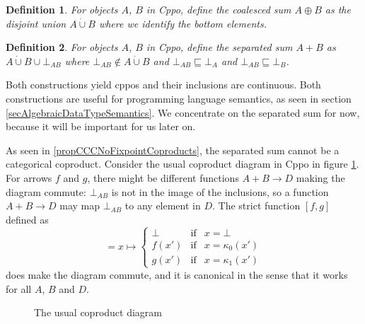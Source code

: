 \documentclass[a4paper]{article}
\newcommand{\below}{\sqsubseteq}
\newcommand{\arr}{\rightarrow}
\newtheorem{definition}{Definition}[section]
\begin{document}
\begin{definition} \label{defCoalescedSum}
For objects $A$, $B$ in Cppo, define the \emph{coalesced sum} $A \oplus B$ as
the disjoint union $A \dot\cup B$ where we identify the bottom elements.
\end{definition}

\begin{definition} \label{defSeparatedSum}
For objects $A$, $B$ in Cppo, define the \emph{separated sum} $A + B$ as $A
\dot\cup B \cup \bot_{AB}$ where $\bot_{AB} \not\in A \dot\cup B$ and $\bot_{AB}
\below \bot_A$ and $\bot_{AB} \below \bot_B$.
\end{definition}

Both constructions yield cppos and their inclusions are continuous.  Both
constructions are useful for programming language semantics, as seen in section
\ref{secAlgebraicDataTypeSemantics}.  We concentrate on the separated sum for
now, because it will be important for us later on.

As seen in \ref{propCCCNoFixpointCoproducts}, the separated sum cannot be a
categorical coproduct. Consider the usual coproduct diagram in Cppo in
figure \ref{figCoproductDiagram}. For arrows $f$ and $g$,
there might be different functions $A+B \arr D$ making the diagram commute:
$\bot_{AB}$ is not in the image of the inclusions, so a function $A+B \arr D$
may map $\bot_{AB}$ to any element in $D$.  The strict function $[f\!,g]$
defined as
\begin{equation*}
[f\!,g] = x \mapsto \left\{
  \begin{array}{lcl}
   \bot   & \text{if} & x = \bot \\
   f(x')  & \text{if} & x = \kappa_0(x') \\
   g(x')  & \text{if} & x = \kappa_1(x')
  \end{array}
\right.
\end{equation*}
does make the diagram commute, and it is canonical in the sense that it
works for all $A$, $B$ and $D$.

\begin{figure}[ht]
\begin{center}
\end{center}
\caption{The usual coproduct diagram} \label{figCoproductDiagram}
\end{figure}
\end{document}

